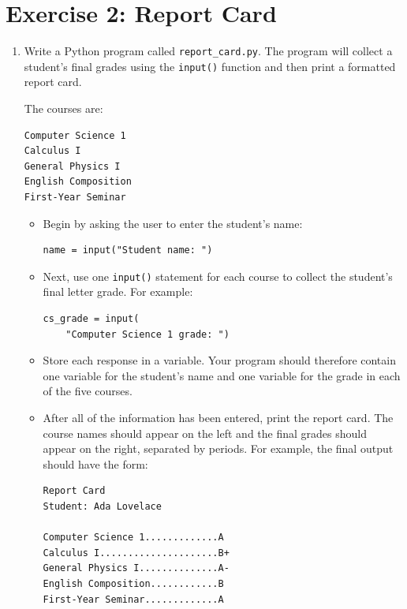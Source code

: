 \documentclass{article}
\begin{document}
\section{Exercise 2: Report Card}

\begin{enumerate}

\item Write a Python program called \texttt{report\_card.py}.  The program will collect a student's final grades using the \texttt{input()} function and then print a formatted report card.

The courses are:

\begin{verbatim}
Computer Science 1
Calculus I
General Physics I
English Composition
First-Year Seminar
\end{verbatim}

\begin{itemize}

\item Begin by asking the user to enter the student's name:
\begin{verbatim}
name = input("Student name: ")
\end{verbatim}
\vspace{0.25cm}

\item Next, use one \texttt{input()} statement for each course to collect the student's final letter grade.  For example:
\begin{verbatim}
cs_grade = input(
    "Computer Science 1 grade: ")
\end{verbatim}
\vspace{0.25cm}

\item Store each response in a variable.  Your program should therefore contain one variable for the student's name and one variable for the grade in each of the five courses. \\ \vspace{0.25cm}

\item After all of the information has been entered, print the report card.  The course names should appear on the left and the final grades should appear on the right, separated by periods.  For example, the final output should have the form:

\begin{verbatim}
Report Card
Student: Ada Lovelace

Computer Science 1.............A
Calculus I.....................B+
General Physics I..............A-
English Composition............B
First-Year Seminar.............A
\end{verbatim}
\vspace{0.25cm}


\end{itemize}
\end{enumerate}
\end{document}
